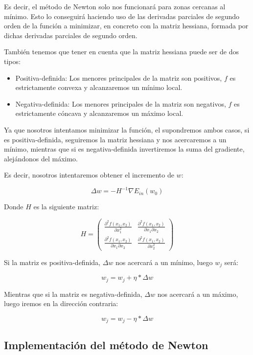 \documentclass[12pt, spanish]{article}
\begin{document}
Es decir, el método de Newton solo nos funcionará para zonas cercanas al mínimo. Esto lo conseguirá haciendo uso de las derivadas parciales de segundo orden de la función a minimizar, en concreto con la matriz hessiana\cite{m-hessiana}, formada por dichas derivadas parciales de segundo orden.

También tenemos que tener en cuenta que la matriz hessiana puede ser de dos tipos:

\begin{itemize}
	\item Positiva-definida: Los menores principales de la matriz son positivos, $f$ es estrictamente convexa y alcanzaremos un mínimo local.
	\item Negativa-definida: Los menores principales de la matriz son negativos, $f$ es estrictamente cóncava y alcanzaremos un máximo local.
\end{itemize}

Ya que nosotros intentamos minimizar la función, el supondremos ambos casos, si es positiva-definida, seguiremos la matriz hessiana y nos acercaremos a un mínimo, mientras que si es negativa-definida invertiremos la suma del gradiente, alejándonos del máximo.

Es decir, nosotros intentaremos obtener el incremento de $w$:

$$ \Delta w = -H^{-1} \nabla E_{in}(w_0) $$

Donde $H$ es la siguiente matriz:


\[ H =  \left( \begin{array}{cc}
\frac{\partial^{2} f(x_1, x_2)}{\partial x_1^2} 					& \frac{\partial^{2} f(x_1, x_2)}{\partial x_1 \partial x_2} \\
\frac{\partial^{2} f(x_1, x_2)}{\partial x_1 \partial x_2} & \frac{\partial^{2} f(x_1, x_2)}{\partial x_2^2}
\end{array} \right ) \] 


Si la matriz es positiva-definida, $\Delta w$ nos acercará a un mínimo, luego $w_j$ será:

$$ w_j = w_j + \eta * \Delta w$$

Mientras que si la matriz es negativa-definida, $\Delta w$ nos acercará a un máximo, luego iremos en la dirección contraria:

$$ w_j = w_j - \eta * \Delta w$$


\subsection{Implementación del método de Newton}
\end{document}
